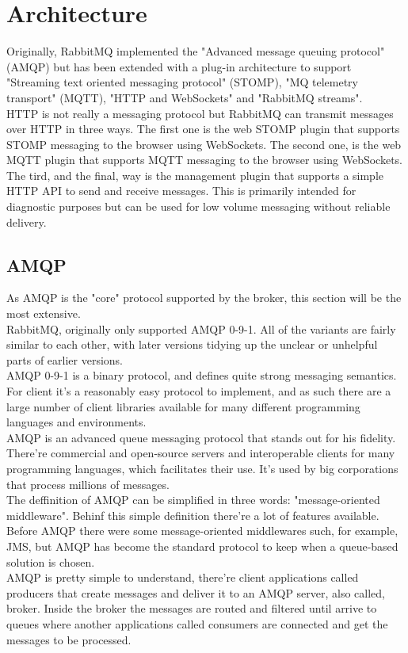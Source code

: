 \documentclass[12pt]{article}
\begin{document}
\section*{Architecture}
Originally, RabbitMQ implemented the "Advanced message queuing protocol" (AMQP) but has been extended with a plug-in architecture to support "Streaming text oriented messaging protocol" (STOMP), "MQ telemetry transport" (MQTT), "HTTP and WebSockets" and "RabbitMQ streams".\\
HTTP is not really a messaging protocol but RabbitMQ can transmit messages over HTTP in three ways. The first one is the web STOMP plugin that supports STOMP messaging to the browser using WebSockets. The second one, is the web MQTT plugin that supports MQTT messaging to the browser using WebSockets. The tird, and the final, way is the management plugin that supports a simple HTTP API to send and receive messages. This is primarily intended for diagnostic purposes but can be used for low volume messaging without reliable delivery.
\newpage
\subsection*{AMQP}
As AMQP is the "core" protocol supported by the broker, this section will be the most extensive.\\
RabbitMQ, originally only supported AMQP 0-9-1. All of the variants are fairly similar to each other, with later versions tidying up the unclear or unhelpful parts of earlier versions.\\
AMQP 0-9-1 is a binary protocol, and defines quite strong messaging semantics. For client it's a reasonably easy protocol to implement, and as such there are a large number of client libraries available for many different programming languages and environments.\\
AMQP is an advanced queue messaging protocol that stands out for his fidelity. There're commercial and open-source servers and interoperable clients for many programming languages, which facilitates  their use. It's used by big corporations that process millions of messages.\\
The deffinition of AMQP can be simplified in three words: "message-oriented middleware". Behinf this simple definition there're a lot of features available. Before AMQP there were some message-oriented middlewares such, for example, JMS, but AMQP has become the standard protocol to keep when a queue-based solution is chosen.\\
AMQP is pretty simple to understand, there're client applications called producers that create messages and deliver it to an AMQP server, also called, broker. Inside the broker the messages are routed and filtered until arrive to queues where another applications called consumers are connected and get the messages to be processed.
\end{document}
